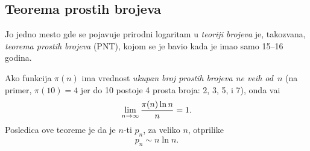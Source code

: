 \subsection{Teorema prostih brojeva}

Jo{\sv} jedno mesto gde se pojav{\lj}uje prirodni logaritam u {\sl teoriji brojeva} je,
takozvana, {\sl teorema prostih brojeva\/} (PNT), kojom se je bavio  kada je
imao samo 15--16 godina.


Ako funkcija $\pi(n)$ ima vrednost {\sl ukupan broj prostih bro\-je\-va ne ve{\cc}ih od~$n$}
(na primer, $\pi(10)=4$ jer do 10 postoje 4 prosta broja: 2, 3, 5, i 7), onda va{\zv}i
$$
\lim_{n\to\infty}\frac{\pi(n)\ln n}{n} = 1.\index{limes}
$$
Posledica ove teoreme je da je $n$-ti  $p_n$, za veliko $n$, otprilike
$$
p_n\sim n\ln n.
$$

